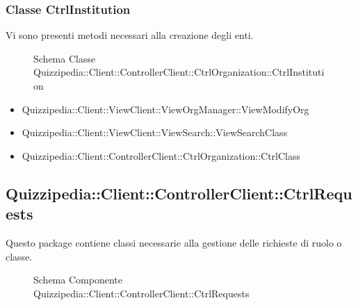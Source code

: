 \subsubsection{Classe CtrlInstitution}
Vi sono presenti metodi necessari alla creazione degli enti.
\begin{figure}[H]
\centering
\noindent{}
\caption[Schema Classe CtrlInstitution]{Schema Classe Quizzipedia::Client::ControllerClient::CtrlOrganization::CtrlInstitution}
\end{figure}
\begin{itemize}
\item Quizzipedia::Client::ViewClient::ViewOrgManager::ViewModifyOrg
\item Quizzipedia::Client::ViewClient::ViewSearch::ViewSearchClass
\end{itemize}
\begin{itemize}
\item Quizzipedia::Client::ControllerClient::CtrlOrganization::CtrlClass
\end{itemize}
\subsection{Quizzipedia::Client::ControllerClient::CtrlRequests}
Questo package contiene classi necessarie alla gestione delle richieste di ruolo o classe.
\begin{figure}[H]
\centering
\noindent{}
\caption[Schema Componente Quizzipedia::Client::ControllerClient::CtrlRequests]{Schema Componente Quizzipedia::Client::ControllerClient::CtrlRequests}
\end{figure}
